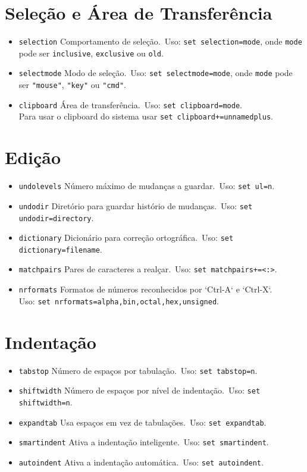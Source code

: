 \section{Seleção e Área de Transferência}

\begin{itemize}
    \item \texttt{selection} Comportamento de seleção.\ Uso: \texttt{set selection=mode}, onde \texttt{mode} pode ser \texttt{inclusive}, \texttt{exclusive} ou \texttt{old}.
    \item \texttt{selectmode} Modo de seleção.\ Uso: \texttt{set selectmode=mode}, onde \texttt{mode} pode ser \texttt{"mouse"}, \texttt{"key"} ou \texttt{"cmd"}.
    \item \texttt{clipboard} Área de transferência.\ Uso: \texttt{set clipboard=mode}.\\Para usar o clipboard do sistema usar \texttt{set clipboard+=unnamedplus}.
\end{itemize}

\section{Edição}

\begin{itemize}
    \item \texttt{undolevels} Número máximo de mudanças a guardar.\ Uso: \texttt{set ul=n}.
    \item \texttt{undodir} Diretório para guardar histório de mudanças.\ Uso: \texttt{set undodir=directory}.
    \item \texttt{dictionary} Dicionário para correção ortográfica.\ Uso: \texttt{set dictionary=filename}.
    \item \texttt{matchpairs} Pares de caracteres a realçar.\ Uso: \texttt{set matchpairs+=<:>}.
    \item \texttt{nrformats} Formatos de números reconhecidos por `Ctrl-A` e `Ctrl-X`.\\Uso: \texttt{set nrformats=alpha,bin,octal,hex,unsigned}.
\end{itemize}

\section{Indentação}

\begin{itemize}
    \item \texttt{tabstop} Número de espaços por tabulação.\ Uso: \texttt{set tabstop=n}.
    \item \texttt{shiftwidth} Número de espaços por nível de indentação.\ Uso: \texttt{set shiftwidth=n}.
    \item \texttt{expandtab} Usa espaços em vez de tabulações.\ Uso: \texttt{set expandtab}.
    \item \texttt{smartindent} Ativa a indentação inteligente.\ Uso: \texttt{set smartindent}.
    \item \texttt{autoindent} Ativa a indentação automática.\ Uso: \texttt{set autoindent}.
\end{itemize}

